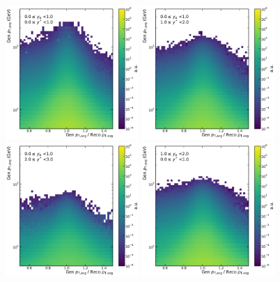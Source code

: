 \begin{figure}[htbp]
    \centering
    \includegraphics[width=0.45\textwidth]{figures/measurement/gen_vs_reco_vs_gen_ptavg_yb0ys0.pdf}\hfill
    \includegraphics[width=0.45\textwidth]{figures/measurement/gen_vs_reco_vs_gen_ptavg_yb0ys1.pdf}
    \includegraphics[width=0.45\textwidth]{figures/measurement/gen_vs_reco_vs_gen_ptavg_yb0ys2.pdf}\hfill
    \includegraphics[width=0.45\textwidth]{figures/measurement/gen_vs_reco_vs_gen_ptavg_yb1ys0.pdf}

\end{figure}

